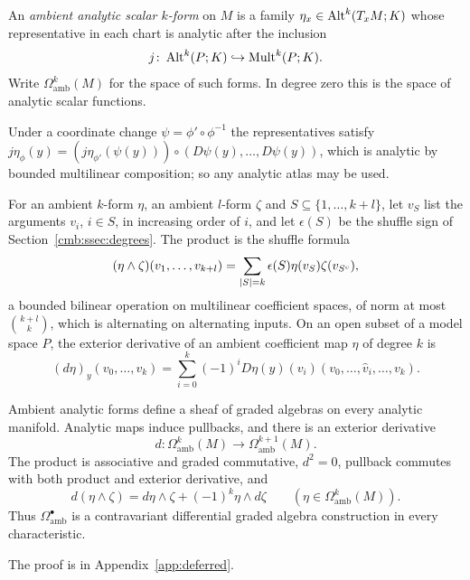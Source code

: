 \begin{definition}
An \emph{ambient analytic scalar $k$\nobreakdash-form} on $M$ is a family $\eta_x\in\operatorname{Alt}^k(T_xM;K)$ whose representative in each chart is analytic after the inclusion
\[
 j\colon\operatorname{Alt}^k(P;K)\hookrightarrow\operatorname{Mult}^k(P;K).
\]
Write $\Omega^k_{\mathrm{amb}}(M)$ for the space of such forms. In degree zero this is the space of analytic scalar functions.
\end{definition}

Under a coordinate change $\psi=\phi'\circ\phi^{-1}$ the representatives satisfy $j\eta_\phi(y)=(j\eta_{\phi'}(\psi(y)))\circ(D\psi(y),\ldots,D\psi(y))$, which is analytic by bounded multilinear composition; so any analytic atlas may be used.

For an ambient $k$\nobreakdash-form $\eta$, an ambient $l$\nobreakdash-form $\zeta$ and $S\subseteq\{1,\ldots,k+l\}$, let $v_S$ list the arguments $v_i$, $i\in S$, in increasing order of $i$, and let $\epsilon(S)$ be the shuffle sign of Section~\ref{cmb:ssec:degrees}. The product is the shuffle formula
\begin{equation}\label{eq:form-shuffle}
 (\eta\wedge\zeta)(v_1,\ldots,v_{k+l})
 =\sum_{\lvert S\rvert=k}\epsilon(S)\eta(v_S)\zeta(v_{S^c}),
\end{equation}
a bounded bilinear operation on multilinear coefficient spaces, of norm at most $\binom{k+l}{k}$, which is alternating on alternating inputs. On an open subset of a model space $P$, the exterior derivative of an ambient coefficient map $\eta$ of degree $k$ is
\begin{equation}\label{eq:exterior-derivative}
 (d\eta)_y(v_0,\ldots,v_k)
 =\sum_{i=0}^k(-1)^iD\eta(y)(v_i)
       (v_0,\ldots,\widehat v_i,\ldots,v_k).
\end{equation}

\begin{theorem}\label{thm:ambient-forms}
Ambient analytic forms define a sheaf of graded algebras on every analytic manifold. Analytic maps induce pullbacks, and there is an exterior derivative
\[
 d\colon\Omega^k_{\mathrm{amb}}(M)\longrightarrow\Omega^{k+1}_{\mathrm{amb}}(M).
\]
The product is associative and graded commutative, $d^2=0$, pullback commutes with both product and exterior derivative, and
\[
 d(\eta\wedge\zeta)=d\eta\wedge\zeta+(-1)^k\eta\wedge d\zeta
 \qquad(\eta\in\Omega^k_{\mathrm{amb}}(M)).
\]
Thus $\Omega^\bullet_{\mathrm{amb}}$ is a contravariant differential graded algebra construction in every characteristic.
\end{theorem}
The proof is in Appendix~\ref{app:deferred}.

